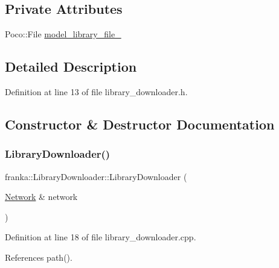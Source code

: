 \subsection*{Private Attributes}
\begin{DoxyCompactItemize}
\item 
Poco\+::\+File \hyperlink{classfranka_1_1LibraryDownloader_a40ea4c7b49484ed554b915e4d1df24f7}{model\+\_\+library\+\_\+file\+\_\+}
\end{DoxyCompactItemize}


\subsection{Detailed Description}


Definition at line 13 of file library\+\_\+downloader.\+h.



\subsection{Constructor \& Destructor Documentation}
\mbox{\label{classfranka_1_1LibraryDownloader_acf92ea08d6799c36eb57df91ab876544}} 
\subsubsection{\texorpdfstring{Library\+Downloader()}{LibraryDownloader()}}
{\footnotesize\ttfamily franka\+::\+Library\+Downloader\+::\+Library\+Downloader (\begin{DoxyParamCaption}\item[{\hyperlink{classfranka_1_1Network}{Network} \&}]{network }\end{DoxyParamCaption})}



Definition at line 18 of file library\+\_\+downloader.\+cpp.



References path().


